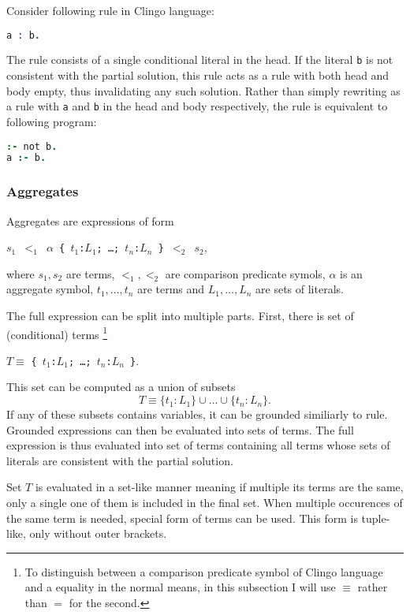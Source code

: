 \begin{example}
    Consider following rule in Clingo language:
    \begin{lstlisting}[language=prolog, numbers=none]
a : b.
\end{lstlisting}
    The rule consists of a single conditional literal in the head.
    If the literal \texttt{b} is not consistent with the partial solution,
    this rule acts as a rule with both head and body empty, thus invalidating any such solution.
    Rather than simply rewriting as a rule with \texttt{a} and \texttt{b}
    in the head and body respectively, the rule is equivalent to following program:
    \begin{lstlisting}[language=prolog, numbers=none]
:- not b.
a :- b.
\end{lstlisting}
\end{example}

\subsubsection{Aggregates}

Aggregates are expressions of form
\begin{center}
    \texttt{$s_1$ $<_1$ $\alpha$ \{ $t_1$:$L_1$; \ldots; $t_n$:$L_n$ \} $<_2$ $s_2$},  %
\end{center}
where $s_1, s_2$ are terms, $<_1, <_2$ are comparison predicate symols,
$\alpha$ is an aggregate symbol,
$t_1, \ldots, t_n$ are terms and $L_1, \ldots, L_n$ are sets of literals.

The full expression can be split into multiple parts. First, there is set of (conditional) terms%
\footnote{To distinguish between a comparison predicate symbol of Clingo language
and a equality in the normal means, in this subsection I will
use $\equiv$ rather than $=$ for the second.}
\begin{center}
    $T \equiv $ \texttt{\{ $t_1$:$L_1$; \ldots; $t_n$:$L_n$ \}}.  %
\end{center}
This set can be computed as a union of subsets
\[T \equiv \{t_1:L_1\}\cup \ldots \cup \{t_n:L_n\}.\]
If any of these subsets contains variables, it can be grounded similiarly to rule.
Grounded expressions can then be evaluated into sets of terms.
The full expression is thus evaluated into set of terms containing all terms whose
sets of literals are consistent with the partial solution.

Set $T$ is evaluated in a set-like manner meaning if multiple its terms are the same,
only a single one of them is included in the final set.
When multiple occurences of the same term is needed, special form of terms can be used.
This form is tuple-like, only without outer brackets.

